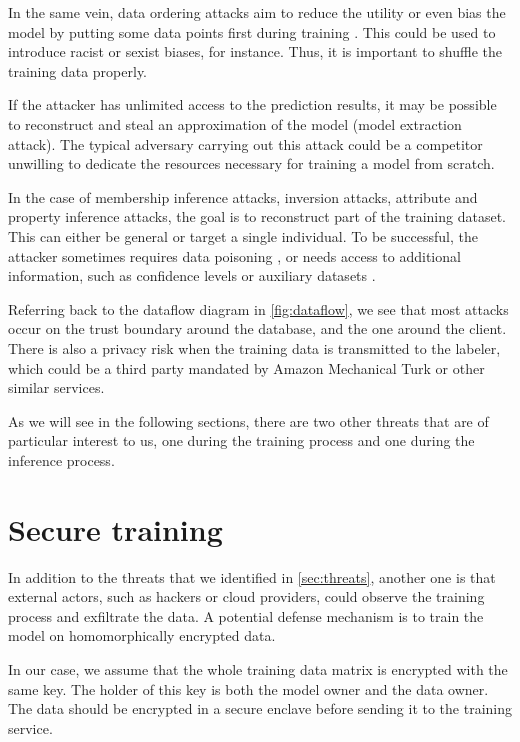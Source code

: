 \documentclass[a4paper,11pt,oneside]{report}
\begin{document}
In the same vein, data ordering attacks aim to reduce the utility or even bias the model by putting some data points first during training \cite{shumailov_manipulating_2021}. 
This could be used to introduce racist or sexist biases, for instance. 
Thus, it is important to shuffle the training data properly.

If the attacker has unlimited access to the prediction results, it may be possible to reconstruct and steal an approximation of the model (model extraction attack). 
The typical adversary carrying out this attack could be a competitor unwilling to dedicate the resources necessary for training a model from scratch.

In the case of membership inference attacks, inversion attacks, attribute and property inference attacks, the goal is to reconstruct part of the training dataset. 
This can either be general or target a single individual. To be successful, the attacker sometimes requires data poisoning \cite{hidano_model_2017}, or needs access to additional information, such as confidence levels or auxiliary datasets \cite{fredrikson_model_2015, wang_variational_2022}.

Referring back to the dataflow diagram in \autoref{fig:dataflow}, we see that most attacks occur on the trust boundary around the database, and the one around the client.
There is also a privacy risk when the training data is transmitted to the labeler, which could be a third party mandated by Amazon Mechanical Turk or other similar services.

As we will see in the following sections, there are two other threats that are of particular interest to us, one during the training process and one during the inference process.

\section{Secure training}\label{sec:secure_training}

In addition to the threats that we identified in \autoref{sec:threats}, another one is that external actors, such as hackers or cloud providers, could observe the training process and exfiltrate the data. 
A potential defense mechanism is to train the model on homomorphically encrypted data.

In our case, we assume that the whole training data matrix is encrypted with the same key. 
The holder of this key is both the model owner and the data owner. 
The data should be encrypted in a secure enclave before sending it to the training service. 
\end{document}
